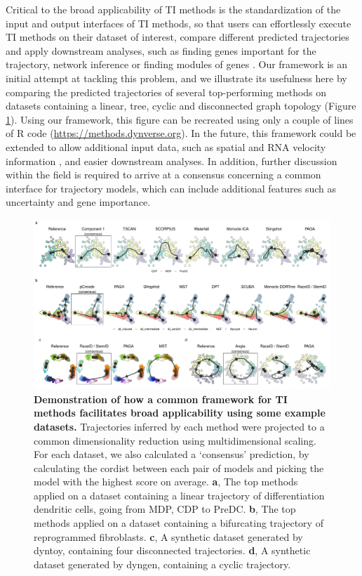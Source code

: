Critical to the broad applicability of TI methods is the standardization of the input and output interfaces of TI methods, so that users can effortlessly execute TI methods on their dataset of interest, compare different predicted trajectories and apply downstream analyses, such as finding genes important for the trajectory, network inference \cite{aibar_scenicsinglecellregulatory_2017} or finding modules of genes \cite{saelens_comprehensiveevaluationmodule_2018}. Our framework is an initial attempt at tackling this problem, and we illustrate its usefulness here by comparing the predicted trajectories of several top-performing methods on datasets containing a linear, tree, cyclic and disconnected graph topology (Figure \ref{fig:figure_6}). Using our framework, this figure can be recreated using only a couple of lines of R code (\url{https://methods.dynverse.org}). In the future, this framework could be extended to allow additional input data, such as spatial and RNA velocity information \cite{lamanno_rnavelocitysingle_2018}, and easier downstream analyses. In addition, further discussion within the field is required to arrive at a consensus concerning a common interface for trajectory models, which can include additional features such as uncertainty and gene importance.

\begin{figure}[tbh!]
	\centering\includegraphics[width=\linewidth]{fig/figure_6.pdf}
	\caption{
		\textbf{Demonstration of how a common framework for TI methods facilitates broad applicability using some example datasets.}
		Trajectories inferred by each method were projected to a common dimensionality reduction using multidimensional scaling. For each dataset, we also calculated a ‘consensus’ prediction, by calculating the cordist between each pair of models and picking the model with the highest score on average. \textbf{a}, The top methods applied on a dataset containing a linear trajectory of differentiation dendritic cells, going from MDP, CDP to PreDC. \textbf{b}, The top methods applied on a dataset containing a bifurcating trajectory of reprogrammed fibroblasts. \textbf{c}, A synthetic dataset generated by dyntoy, containing four disconnected trajectories. \textbf{d}, A synthetic dataset generated by dyngen, containing a cyclic trajectory.
	}
	\label{fig:figure_6}
\end{figure}

